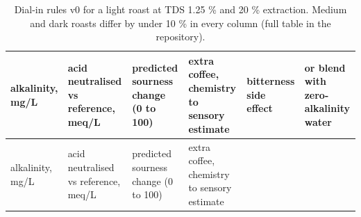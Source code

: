 \documentclass[
  a4paper,
]{article}
\author{}
\date{}
\begin{document}
\begin{longtable}[]{@{}
  >{\raggedright\arraybackslash}p{}
  >{\raggedright\arraybackslash}p{}
  >{\raggedright\arraybackslash}p{}
  >{\raggedright\arraybackslash}p{}
  >{\raggedright\arraybackslash}p{}
  >{\raggedright\arraybackslash}p{}@{}}
\caption{Dial-in rules v0 for a light roast at TDS 1.25 \% and 20 \%
extraction. Medium and dark roasts differ by under 10 \% in every column
(full table in the repository).}\label{tbl-rules}\tabularnewline
\toprule\noalign{}
\begin{minipage}[b]{\linewidth}\raggedright
alkalinity, mg/L
\end{minipage} & \begin{minipage}[b]{\linewidth}\raggedright
acid neutralised vs reference, meq/L
\end{minipage} & \begin{minipage}[b]{\linewidth}\raggedright
predicted sourness change (0 to 100)
\end{minipage} & \begin{minipage}[b]{\linewidth}\raggedright
extra coffee, chemistry to sensory estimate
\end{minipage} & \begin{minipage}[b]{\linewidth}\raggedright
bitterness side effect
\end{minipage} & \begin{minipage}[b]{\linewidth}\raggedright
or blend with zero-alkalinity water
\end{minipage} \\
\midrule\noalign{}
\endfirsthead
\toprule\noalign{}
\begin{minipage}[b]{\linewidth}\raggedright
alkalinity, mg/L
\end{minipage} & \begin{minipage}[b]{\linewidth}\raggedright
acid neutralised vs reference, meq/L
\end{minipage} & \begin{minipage}[b]{\linewidth}\raggedright
predicted sourness change (0 to 100)
\end{minipage} & \begin{minipage}[b]{\linewidth}\raggedright
extra coffee, chemistry to sensory estimate
\end{minipage} & \begin{minipage}[b]{\linewidth}\raggedright

\end{minipage}
\end{longtable}
\end{document}
